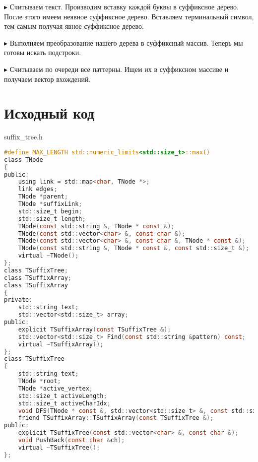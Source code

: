 $\blacktriangleright$ Считываем текст. Производим вставку каждой буквы в суффиксное дерево. После этого имеем неявное суффиксное дерево. Вставляем терминальный символ, тем самым получая явное суффиксное дерево.

$\blacktriangleright$ Выполняем преобразование нашего дерева в суффиксный массив. Теперь мы готовы искать подстроки.

$\blacktriangleright$ Считываем по очереди все паттерны. Ищем их в суффиксном массиве и получаем вектор вхождений.
\pagebreak

\section{Исходный код}
suffix\_tree.h
\begin{lstlisting}[language=C]
#define MAX_LENGTH std::numeric_limits<std::size_t>::max()
class TNode 
{
public:
    using link = std::map<char, TNode *>;
    link edges;
    TNode *parent;
    TNode *suffixLink;
    std::size_t begin;
    std::size_t length;
    TNode(const std::string &, TNode * const &);
    TNode(const std::vector<char> &, const char &);
    TNode(const std::vector<char> &, const char &, TNode * const &);
    TNode(const std::string &, TNode * const &, const std::size_t &);
    virtual ~TNode();
};
class TSuffixTree;
class TSuffixArray;
class TSuffixArray
{
private:
    std::string text;
    std::vector<std::size_t> array;
public:
    explicit TSuffixArray(const TSuffixTree &);
    std::vector<std::size_t> Find(const std::string &pattern) const;
    virtual ~TSuffixArray();
};
class TSuffixTree
{
    std::string text;
    TNode *root;
    TNode *active_vertex;
    std::size_t activeLength;
    std::size_t activeCharIdx;
    void DFS(TNode * const &, std::vector<std::size_t> &, const std::size_t &) const;
    friend TSuffixArray::TSuffixArray(const TSuffixTree &);
public:
    explicit TSuffixTree(const std::vector<char> &, const char &);
    void PushBack(const char &ch);
    virtual ~TSuffixTree();
};
\end{lstlisting}
\pagebreak
